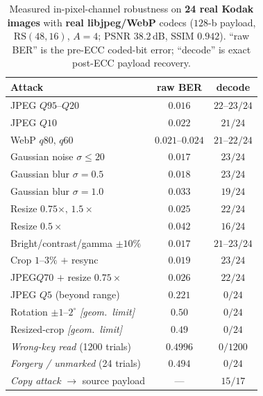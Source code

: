 \documentclass[journal]{IEEEtran}
\begin{document}
\begin{table}[t]
\centering
\caption{Measured in-pixel-channel robustness on \textbf{24 real Kodak images}
with \textbf{real libjpeg/WebP} codecs ($128$-b payload, $\mathrm{RS}(48,16)$,
$A\!=\!4$; PSNR $38.2$\,dB, SSIM $0.942$). ``raw BER'' is the pre-ECC coded-bit
error; ``decode'' is exact post-ECC payload recovery.}
\label{tab:robust}
\renewcommand{\arraystretch}{1.15}
\setlength{\tabcolsep}{5pt}
\footnotesize
\begin{tabular}{@{}lcc@{}}
\toprule
\textbf{Attack} & \textbf{raw BER} & \textbf{decode} \\
\midrule
JPEG $Q95$--$Q20$                  & $0.016$ & $22$--$23/24$ \\
JPEG $Q10$                         & $0.022$ & $21/24$ \\
WebP $q80,\,q60$                   & $0.021$--$0.024$ & $21$--$22/24$ \\
Gaussian noise $\sigma\!\le\!20$   & $0.017$ & $23/24$ \\
Gaussian blur $\sigma\!=\!0.5$     & $0.018$ & $23/24$ \\
Gaussian blur $\sigma\!=\!1.0$     & $0.033$ & $19/24$ \\
Resize $0.75\times,\,1.5\times$    & $0.025$ & $22/24$ \\
Resize $0.5\times$                 & $0.042$ & $16/24$ \\
Bright/contrast/gamma $\pm10\%$    & $0.017$ & $21$--$23/24$ \\
Crop $1$--$3\%$ $+$ resync          & $0.019$ & $23/24$ \\
JPEG$Q70$ $+$ resize $0.75\times$  & $0.026$ & $22/24$ \\
\midrule
JPEG $Q5$ (beyond range)           & $0.221$ & $0/24$ \\
Rotation $\pm1$--$2^\circ$ \emph{[geom.\ limit]} & $0.50$ & $0/24$ \\
Resized-crop \emph{[geom.\ limit]} & $0.49$ & $0/24$ \\
\midrule
\emph{Wrong-key read} (1200 trials) & $0.4996$ & $0/1200$ \\
\emph{Forgery / unmarked} (24 trials) & $0.494$ & $0/24$ \\
\emph{Copy attack} $\to$ source payload & --- & $15/17$ \\
\bottomrule
\end{tabular}
\end{table}
\end{document}
